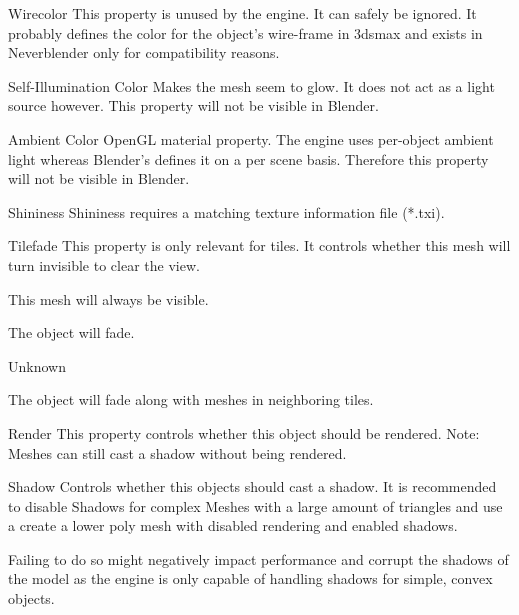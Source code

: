 \begin{propertyAurora}{Wirecolor}
This property is unused by the engine. It can safely be ignored. It probably defines the
color for the object's wire-frame in 3dsmax and exists in Neverblender only for 
compatibility reasons.
\end{propertyAurora}

\begin{propertyAurora}{Self-Illumination Color}
Makes the mesh seem to glow. It does not act as a light source however.
This property will not be visible in Blender.
\end{propertyAurora}

\begin{propertyAurora}{Ambient Color}
OpenGL material property. The engine uses per-object ambient light whereas Blender's 
defines it on a per scene basis. Therefore this property will not be visible in Blender.
\end{propertyAurora}

\begin{propertyAurora}{Shininess}
Shininess requires a matching texture information file (*.txi).
\end{propertyAurora}

\begin{propertyAurora}{Tilefade}
This property is only relevant for tiles. It controls whether this 
mesh will turn invisible to clear the view.
\begin{description}[leftmargin=6em,style=nextline]
    \item[None] This mesh will always be visible.
    \item[Fade] The object will fade.
    \item[Base] Unknown
    \item[Neighbour] The object will fade along with meshes in neighboring tiles.
\end{description}
\end{propertyAurora}

\begin{propertyAurora}{Render}
This property controls whether this object should be rendered. Note: Meshes can still
cast a shadow without being rendered.
\end{propertyAurora}

\begin{propertyAurora}{Shadow}
Controls whether this objects should cast a shadow. It is recommended to 
disable Shadows for complex Meshes with a large amount of triangles and 
use a create a lower poly mesh with disabled rendering and enabled shadows.

Failing to do so might negatively impact performance and corrupt the shadows of the 
model as the engine is only capable of handling shadows for simple, convex objects.
\end{propertyAurora}


